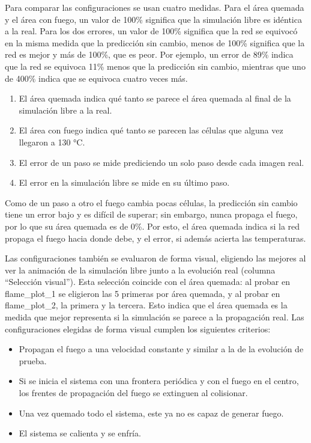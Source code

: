 	Para comparar las configuraciones se usan cuatro medidas. Para el área quemada y el área con fuego, un valor de 100\% significa que la simulación libre es idéntica a la real. Para los dos errores, un valor de 100\% significa que la red se equivocó en la misma medida que la predicción sin cambio, menos de 100\% significa que la red es mejor y más de 100\%, que es peor. Por ejemplo, un error de 89\% indica que la red se equivoca 11\% menos que la predicción sin cambio, mientras que uno de 400\% indica que se equivoca cuatro veces más. 
	
	\begin{enumerate}
		\item El área quemada indica qué tanto se parece el área quemada al final de la simulación libre a la real.
		\item El área con fuego indica qué tanto se parecen las células que alguna vez llegaron a 130 °C.
		\item El error de un paso se mide prediciendo un solo paso desde cada imagen real.
		\item El error en la simulación libre se mide en su último paso.
	\end{enumerate} 

	Como de un paso a otro el fuego cambia pocas células, la predicción sin cambio tiene un error bajo y es difícil de superar; sin embargo, nunca propaga el fuego, por lo que su área quemada es de 0\%. Por esto, el área quemada indica si la red propaga el fuego hacia donde debe, y el error, si además acierta las temperaturas.

	Las configuraciones también se evaluaron de forma visual, eligiendo las mejores al ver la animación de la simulación libre junto a la evolución real (columna ``Selección visual''). Esta selección coincide con el área quemada: al probar en flame\_plot\_1 se eligieron las 5 primeras por área quemada, y al probar en flame\_plot\_2, la primera y la tercera. Esto indica que el área quemada es la medida que mejor representa si la simulación se parece a la propagación real. Las configuraciones elegidas de forma visual cumplen los siguientes criterios:
	
	\begin{itemize}
		\item Propagan el fuego a una velocidad constante y similar a la de la evolución de prueba.
		\item Si se inicia el sistema con una frontera periódica y con el fuego en el centro, los frentes de propagación del fuego se extinguen al colisionar.
		\item Una vez quemado todo el sistema, este ya no es capaz de generar fuego.
		\item El sistema se calienta y se enfría.
	\end{itemize}

